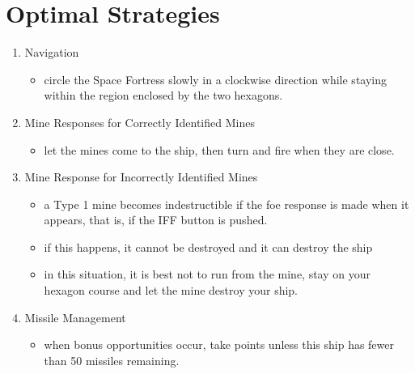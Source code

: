 \documentclass[letterpaper,12pt]{article}
\begin{document}
\section{Optimal Strategies}
\begin{enumerate}
\item Navigation
\begin{itemize}
\item circle the Space Fortress slowly in a clockwise direction while staying within the region
enclosed by the two hexagons.
\end{itemize}
\item Mine Responses for Correctly Identified Mines
\begin{itemize}
\item let the mines come to the ship, then turn and fire when they are close.
\end{itemize}
\item Mine Response for Incorrectly Identified Mines
\begin{itemize}
\item a Type 1 mine becomes indestructible if the foe response is made when it appears, that
is, if the IFF button is pushed.
\item if this happens, it cannot be destroyed and it can destroy the ship
\item in this situation, it is best not to run from the mine, stay on your hexagon course and let
the mine destroy your ship.
\end{itemize}
\item Missile Management
\begin{itemize}
\item when bonus opportunities occur, take points unless this ship has fewer than 50 missiles
remaining.
\end{itemize}
\end{enumerate}


\clearpage
\end{document}
